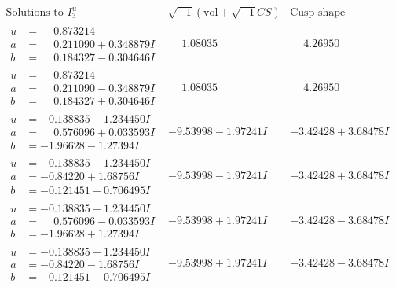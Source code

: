 \documentclass[1p]{elsarticle_modified}
\theoremstyle{definition}
\newcommand{\I}{\sqrt{-1}}
\begin{document}
$$\begin{array}{c|c|c}  
\text{Solutions to }I^u_{3}& \I (\text{vol} + \sqrt{-1}CS) & \text{Cusp shape}\\
 \hline 
\begin{aligned}
u &= \phantom{-}0.873214\phantom{ +0.000000I} \\
a &= \phantom{-}0.211090 + 0.348879 I \\
b &= \phantom{-}0.184327 - 0.304646 I\end{aligned}
 & \phantom{-}1.08035\phantom{ +0.000000I} & \phantom{-}4.26950\phantom{ +0.000000I} \\ \hline\begin{aligned}
u &= \phantom{-}0.873214\phantom{ +0.000000I} \\
a &= \phantom{-}0.211090 - 0.348879 I \\
b &= \phantom{-}0.184327 + 0.304646 I\end{aligned}
 & \phantom{-}1.08035\phantom{ +0.000000I} & \phantom{-}4.26950\phantom{ +0.000000I} \\ \hline\begin{aligned}
u &= -0.138835 + 1.234450 I \\
a &= \phantom{-}0.576096 + 0.033593 I \\
b &= -1.96628 - 1.27394 I\end{aligned}
 & -9.53998 - 1.97241 I & -3.42428 + 3.68478 I \\ \hline\begin{aligned}
u &= -0.138835 + 1.234450 I \\
a &= -0.84220 + 1.68756 I \\
b &= -0.121451 + 0.706495 I\end{aligned}
 & -9.53998 - 1.97241 I & -3.42428 + 3.68478 I \\ \hline\begin{aligned}
u &= -0.138835 - 1.234450 I \\
a &= \phantom{-}0.576096 - 0.033593 I \\
b &= -1.96628 + 1.27394 I\end{aligned}
 & -9.53998 + 1.97241 I & -3.42428 - 3.68478 I \\ \hline\begin{aligned}
u &= -0.138835 - 1.234450 I \\
a &= -0.84220 - 1.68756 I \\
b &= -0.121451 - 0.706495 I\end{aligned}
 & -9.53998 + 1.97241 I & -3.42428 - 3.68478 I \\ \hline\begin{aligned}

\end{aligned}
\end{array}$$
\end{document}
